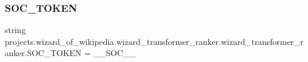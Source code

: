 \subsubsection{\texorpdfstring{S\+O\+C\+\_\+\+T\+O\+K\+EN}{SOC\_TOKEN}}
{\footnotesize\ttfamily string projects.\+wizard\+\_\+of\+\_\+wikipedia.\+wizard\+\_\+transformer\+\_\+ranker.\+wizard\+\_\+transformer\+\_\+ranker.\+S\+O\+C\+\_\+\+T\+O\+K\+EN = \textquotesingle{}\+\_\+\+\_\+\+S\+O\+C\+\_\+\+\_\+\textquotesingle{}}

